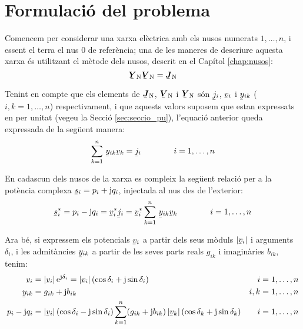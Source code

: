 \section{Formulació del problema}\label{sec:formul_prob} 

Comencem per considerar una xarxa elèctrica amb els nusos numerats
$1,\ldots,n$, i essent el terra el nus 0 de referència; una de les
maneres de descriure aquesta xarxa és utilitzant el mètode dels
nusos, descrit en el Capítol \ref{chap:nusos}:
\begin{equation}
    \mcmplx{Y}\ped{N} \mcmplx{V}\ped{N} = \mcmplx{J}\ped{N}
\end{equation}

Tenint en compte que els elements de $\mcmplx{J}\ped{N}$,
$\mcmplx{V}\ped{N}$ i $\mcmplx{Y}\ped{N}$ són $\cmplx{j}_i$,
$\cmplx{v}_i$ i  $\cmplx{y}_{ik}$ ($i,k=1,\ldots,n$) respectivament,
i que aquests valors suposem que estan expressats en per unitat (vegeu la
Secció \ref{sec:seccio_pu}), l'equació anterior queda expressada de
la següent manera:
\begin{equation}
    \sum^n_{k=1}\, \cmplx{y}_{ik} \cmplx{v}_k = \cmplx{j}_i \qquad\qquad i=1,\ldots,n
\end{equation}

En cadascun dels nusos de la xarxa es compleix la següent relació
per a la potència complexa $\cmplx{s}_i = p_i + \ju q_i$, injectada
al nus des de l'exterior:
\begin{equation}
    \cmplx{s}_i^* = p_i - \ju q_i = \cmplx{v}_i^* \cmplx{j}_i = \cmplx{v}_i^*
    \sum^n_{k=1}\, \cmplx{y}_{ik} \cmplx{v}_k \qquad\qquad i=1,\ldots,n \label{eq:sconj}
\end{equation}

Ara bé, si expressem els potencials $\cmplx{v}_i$ a partir dels seus mòduls $|\cmplx{v}_i|$
i arguments $\delta_i$, i les admitàncies $\cmplx{y}_{ik}$ a partir de les seves parts
reals $g_{ik}$ i imaginàries $b_{ik}$, tenim:
\begin{align}
    \cmplx{v}_i &=|\cmplx{v}_i|\, \eu^{\ju\delta_i} = |\cmplx{v}_i|\,
    (\cos\delta_i+\ju\sin\delta_i) & i & =1,\ldots,n\\
    \cmplx{y}_{ik} &= g_{ik} + \ju b_{ik} & i,k & =1,\ldots,n \\
    p_i - \ju q_i &= |\cmplx{v}_i|\, (\cos\delta_i - \ju\sin\delta_i) \sum^n_{k=1} (g_{ik} + \ju
    b_{ik}) \,|\cmplx{v}_k| \,(\cos\delta_k + \ju\sin\delta_k) & i & =1,\ldots,n
\end{align}

